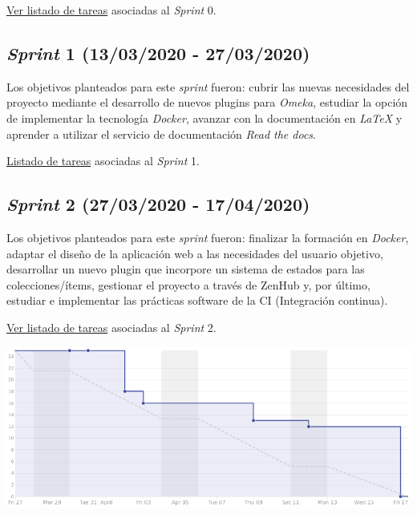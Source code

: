\documentclass[
]{article}
\begin{document}
\href{https://github.com/gcm1001/TFG-CeniehAriadne/milestone/1}{Ver
listado de tareas} asociadas al \emph{Sprint} 0.

\hypertarget{sprint-1-13032020---27032020}{%
\subsection{\texorpdfstring{\emph{Sprint} 1 (13/03/2020 -
27/03/2020)}{Sprint 1 (13/03/2020 - 27/03/2020)}}\label{sprint-1-13032020---27032020}}

Los objetivos planteados para este \emph{sprint} fueron: cubrir las
nuevas necesidades del proyecto mediante el desarrollo de nuevos plugins
para \emph{Omeka}, estudiar la opción de implementar la tecnología
\emph{Docker}, avanzar con la documentación en \emph{LaTeX} y aprender a
utilizar el servicio de documentación \emph{Read the docs}.

\href{https://github.com/gcm1001/TFG-CeniehAriadne/milestone/2}{Listado
de tareas} asociadas al \emph{Sprint} 1.

\hypertarget{sprint-2-27032020---17042020}{%
\subsection{\texorpdfstring{\emph{Sprint} 2 (27/03/2020 -
17/04/2020)}{Sprint 2 (27/03/2020 - 17/04/2020)}}\label{sprint-2-27032020---17042020}}

Los objetivos planteados para este \emph{sprint} fueron: finalizar la
formación en \emph{Docker}, adaptar el diseño de la aplicación web a las
necesidades del usuario objetivo, desarrollar un nuevo plugin que
incorpore un sistema de estados para las colecciones/ítems, gestionar el
proyecto a través de ZenHub y, por último, estudiar e implementar las
prácticas software de la CI (Integración continua).

\href{https://github.com/gcm1001/TFG-CeniehAriadne/milestone/3}{Ver
listado de tareas} asociadas al \emph{Sprint} 2.

\includegraphics{../_static/images/sprint02.png}
\end{document}
